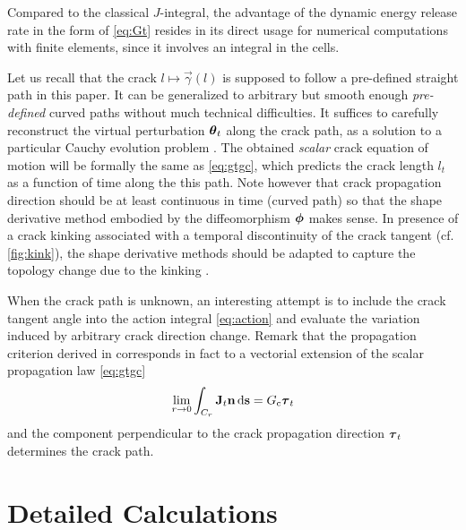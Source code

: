 \begin{remark}
Compared to the classical $J$-integral, the advantage of the dynamic energy release rate in the form of \eqref{eq:Gt} resides in its direct usage for numerical computations with finite elements, since it involves an integral in the cells. 
\end{remark}

\begin{remark}
Let us recall that the crack $l\mapsto\vec{\gamma}(l)$ is supposed to follow a pre-defined straight path in this paper. It can be generalized to arbitrary but smooth enough \emph{pre-defined} curved paths without much technical difficulties. It suffices to carefully reconstruct the virtual perturbation $\vtheta_t$ along the crack path, as a solution to a particular Cauchy evolution problem \cite{KhludnevSokolowskiSzulc:2010}. The obtained \emph{scalar} crack equation of motion will be formally the same as \eqref{eq:gtgc}, which predicts the crack length $l_t$ as a function of time along the this path. Note however that crack propagation direction should be at least continuous in time (curved path) so that the shape derivative method embodied by the diffeomorphism $\philt$ makes sense. In presence of a crack kinking associated with a temporal discontinuity of the crack tangent (cf. \cref{fig:kink}), the shape derivative methods should be adapted to capture the topology change due to the kinking \cite{Hintermuller:2011}.

When the crack path is unknown, an interesting attempt is to include the crack tangent angle into the action integral \eqref{eq:action} and evaluate the variation induced by arbitrary crack direction change. Remark that the propagation criterion derived in \cite{Oleaga:2001,Adda-BediaAriasAmarLund:1999} corresponds in fact to a vectorial extension of the scalar propagation law \eqref{eq:gtgc}
\[
\lim_{r\to 0}\int_{C_r}\vec{J}_t\vec{n}\ds=\gc\vtau_t
\]
and the component perpendicular to the crack propagation direction $\vtau_t$ determines the crack path.  
\end{remark}

\chapter{Detailed Calculations} \label{chap:detailedcal}

